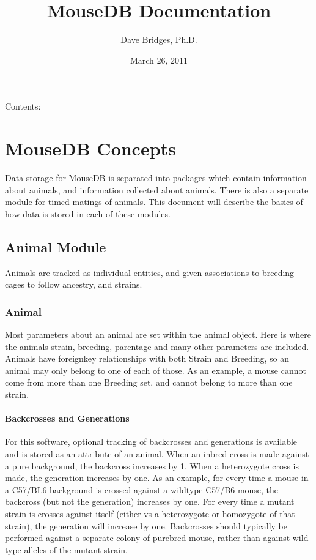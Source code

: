 \documentclass[letterpaper,10pt,english]{sphinxmanual}
\title{MouseDB Documentation}
\date{March 26, 2011}
\author{Dave Bridges, Ph.D.}
\begin{document}
\maketitle
\tableofcontents
{}\label{index::doc}


Contents:


\chapter{MouseDB Concepts}
\label{concepts:welcome-to-mousedb-s-documentation}\label{concepts::doc}\label{concepts:mousedb-concepts}
Data storage for MouseDB is separated into packages which contain information about animals, and information collected about animals.  There is also a separate module for timed matings of animals.  This document will describe the basics of how data is stored in each of these modules.


\section{Animal Module}
\label{concepts:animal-module}
Animals are tracked as individual entities, and given associations to breeding cages to follow ancestry, and strains.


\subsection{Animal}
\label{concepts:animal}
Most parameters about an animal are set within the animal object.  Here is where the animals strain, breeding, parentage and many other parameters are included.  Animals have foreignkey relationships with both Strain and Breeding, so an animal may only belong to one of each of those.  As an example, a mouse cannot come from more than one Breeding set, and cannot belong to more than one strain.


\subsubsection{Backcrosses and Generations}
\label{concepts:backcrosses-and-generations}
For this software, optional tracking of backcrosses and generations is available and is stored as an attribute of an animal.  When an inbred cross is made against a pure background, the backcross increases by 1.  When a heterozygote cross is made, the generation increases by one.  As an example, for every time a mouse in a C57/BL6 background is crossed against a wildtype C57/B6 mouse, the backcross (but not the generation) increases by one.  For every time a mutant strain is crosses against itself (either vs a heterozygote or homozygote of that strain), the generation will increase by one.  Backcrosses should typically be performed against a separate colony of purebred mouse, rather than against wild-type alleles of the mutant strain.
\end{document}
